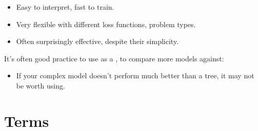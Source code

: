        \begin{itemize}
            \item Easy to interpret, fast to train.
            \item Very flexible with different loss functions, problem types.

            \item Often surprisingly effective, despite their simplicity.\\
        \end{itemize}

        \begin{concept}
            It's often good practice to use  as a , to compare more  models against:

            \begin{itemize}
                \item If your complex model doesn't perform much better than a tree, it may not be worth using.
            \end{itemize}
        \end{concept}


\pagebreak

\section{Terms}

